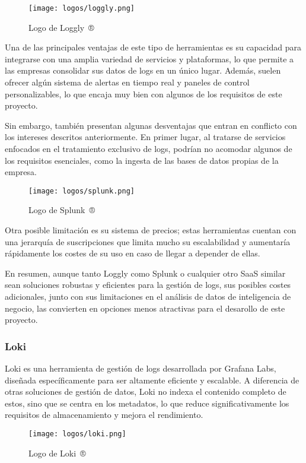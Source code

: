 \begin{figure}[H]
	\centering
	\texttt{[image: logos/loggly.png]}
	\caption{Logo de Loggly~®}
\end{figure}

Una de las principales ventajas de este tipo de herramientas es su capacidad
para integrarse con una amplia variedad de servicios y plataformas, lo que
permite a las empresas consolidar sus datos de logs en un único lugar. Además,
suelen ofrecer algún sistema de alertas en tiempo real y paneles de control
personalizables, lo que encaja muy bien con algunos de los requisitos de este
proyecto.

Sin embargo, también presentan algunas desventajas que entran en conflicto con
los intereses descritos anteriormente. En primer lugar, al tratarse de
servicios enfocados en el tratamiento exclusivo de logs, podrían no acomodar
algunos de los requisitos esenciales, como la ingesta de las bases de datos
propias de la empresa.

\begin{figure}[H]
	\centering
	\texttt{[image: logos/splunk.png]}
	\caption{Logo de Splunk~®}
\end{figure}

Otra posible limitación es su sistema de precios; estas herramientas cuentan con
una jerarquía de suscripciones que limita mucho su escalabilidad y aumentaría
rápidamente los costes de su uso en caso de llegar a depender de ellas.

\newpage{}
En resumen, aunque tanto Loggly como Splunk o cualquier otro SaaS similar
sean soluciones robustas y eficientes para la gestión de logs, sus posibles
costes adicionales, junto con sus limitaciones en el análisis de datos de
inteligencia de negocio, las convierten en opciones menos atractivas para el
desarollo de este proyecto.

\subsubsection{Loki}
Loki es una herramienta de gestión de logs desarrollada por Grafana Labs,
diseñada específicamente para ser altamente eficiente y escalable. A diferencia
de otras soluciones de gestión de datos, Loki no indexa el contenido completo de
estos, sino que se centra en los metadatos, lo que reduce significativamente
los requisitos de almacenamiento y mejora el rendimiento.

\begin{figure}[H]
	\centering
	\texttt{[image: logos/loki.png]}
	\caption{Logo de Loki~®}
\end{figure}

